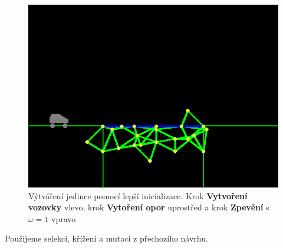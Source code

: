 \begin{figure}[ht]
\begin{minipage}{0.32\textwidth}
        \includegraphics[width=\linewidth]{img/better_init3.png}
    \end{minipage}
    \caption{Výtváření jedince pomocí lepší inicializace. Krok \textbf{Vytvoření vozovky} vlevo, krok \textbf{Vytoření opor} uprostřed a krok \textbf{Zpevění} s $\omega = 1$ vpravo}
    \label{impl-fig:7}
\end{figure}

Použijeme selekci, křížení a mutaci z přechozího návrhu.
\def\ThesisTitleEN{Evolutionary algorithms for 2D bridge construction in the Poly Bridge game}

\def\ThesisAuthor{Václav Krňák}

\def\YearSubmitted{2024}

\def\Department{Katedra teoretické informatiky a matematické logiky}
\def\DepartmentEN{Department of Theoretical Computer Science and Mathematical Logic}

\def\DeptType{Katedra}
\def\DeptTypeEN{Department}

\def\Supervisor{Mgr. Roman Neruda, CSc.}

\def\SupervisorsDepartment{Katedra teoretické informatiky a matematické logiky}
\def\SupervisorsDepartmentEN{Department of Theoretical Computer Science and Mathematical Logic}

